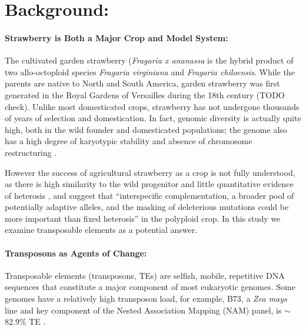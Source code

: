 \documentclass[fleqn,10pt]{olplainarticle}
\begin{document}
\flushbottom
\maketitle
\thispagestyle{empty}

\newpage
\section{Background:}
\paragraph{Strawberry is Both a Major Crop and Model System:}
The cultivated garden strawberry (\textit{Fragaria x ananassa} is the hybrid product of two allo-octoploid species \textit{Fragaria virginiana} and \textit{Fragaria chiloensis}.
While the parents are native to North and South America, garden strawberry was first generated in the Royal Gardens of Versailles during the 18th century (TODO check).
Unlike most domesticated crops, strawberry has not undergone thousands of years of selection and domestication.
In fact, genomic diversity is actually quite high, both in the wild founder and domesticated populations; the genome also has a high degree of karyotypic stability and absence of chromosome restructuring \cite{Hardigan2020, Hardigan2021}.

However the success of agricultural strawberry as a crop is not fully understood, as there is high similarity to the wild progenitor and little quantitative evidence of heterosis \cite{Stegmeir2010, Rho2012, Hardigan2020}, and \cite{Hardigan2020} suggest that ``interspecific complementation, a broader pool of potentially adaptive alleles, and the masking of deleterious mutations could be more important than fixed heterosis'' in the polyploid crop.
In this study we examine transposable elements as a potential answer.

\paragraph{Transposons as Agents of Change:}
Transposable elements (transposons, TEs) are selfish, mobile, repetitive DNA sequences that constitute a major component of most eukaryotic genomes.
Some genomes have a relatively high transposon load, for example, B73, a \textit{Zea mays} line and key component of the Nested Association Mapping (NAM) panel, is $\sim$82.9\% TE \cite{Hufford2021}.
\end{document}
